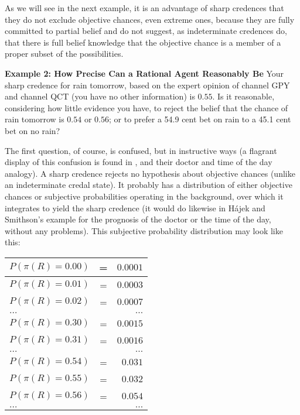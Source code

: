 \documentclass[11pt]{article}
\begin{document}
As we will see in the next example, it is an advantage of sharp
credences that they do not exclude objective chances, even extreme
ones, because they are fully committed to partial belief and do not
suggest, as indeterminate credences do, that there is full belief
knowledge that the objective chance is a member of a proper subset of
the possibilities.

\begin{quotex}
  \textbf{Example 2: How Precise Can a Rational Agent Reasonably Be}
  Your sharp credence for rain tomorrow, based on the expert opinion
  of channel GPY and channel QCT (you have no other information) is
  $0.55$. Is it reasonable, considering how little evidence you have,
  to reject the belief that the chance of rain tomorrow is $0.54$ or
  $0.56$; or to prefer a 54.9 cent bet on rain to a 45.1 cent bet on
  no rain?
\end{quotex}

The first question, of course, is confused, but in instructive ways (a
flagrant display of this confusion is found in
, and their doctor and time of the day
analogy). A sharp credence rejects no hypothesis about objective
chances (unlike an indeterminate credal state). It probably has a
distribution of either objective chances or subjective probabilities
operating in the background, over which it integrates to yield the
sharp credence (it would do likewise in H{\'a}jek and Smithson's
example for the prognosis of the doctor or the time of the day,
without any problems). This subjective probability distribution may
look like this:

\begin{tabular}{|lcr|} \hline
$P(\pi(R)=0.00)$ & = & $0.0001$ \\ \hline
$P(\pi(R)=0.01)$ & = & $0.0003$ \\ \hline
$P(\pi(R)=0.02)$ & = & $0.0007$ \\ \hline
$\ldots$ & & $\ldots$ \\ \hline
$P(\pi(R)=0.30)$ & = & $0.0015$ \\ \hline
$P(\pi(R)=0.31)$ & = & $0.0016$ \\ \hline
$\ldots$ & & $\ldots$ \\ \hline
$P(\pi(R)=0.54)$ & = & $0.031$ \\ \hline
$P(\pi(R)=0.55)$ & = & $0.032$ \\ \hline
$P(\pi(R)=0.56)$ & = & $0.054$ \\ \hline
$\ldots$ & & $\ldots$ \\ \hline
\end{tabular}
\end{document}
